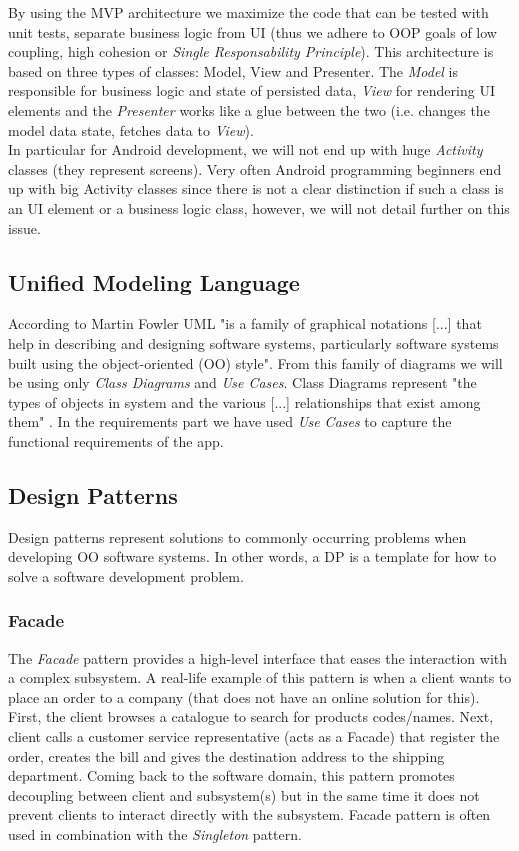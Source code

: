 \documentclass{article}[11]
\begin{document}
	 By using the \ac{MVP} architecture we maximize the code that can be tested with unit tests, separate business logic from UI (thus we adhere to OOP goals of low coupling, high cohesion or \emph{Single Responsability Principle}).  This architecture is based on three types of classes: Model, View and Presenter. The \emph{Model} is responsible for business logic and state of persisted data, \emph{View} for rendering UI elements and the \emph{Presenter} works like a glue between the two (i.e. changes the model data state, fetches data to \emph{View}).\\
	
	 In particular for Android development, we will not end up with huge \emph{Activity} classes (they represent screens). Very often Android programming beginners end up with big Activity classes since there is not a clear distinction if such a class is an UI element or a business logic class, however, we will not detail further on this issue.
	
	\subsection{Unified Modeling Language}
	According to Martin Fowler \cite{fowler2004uml} \ac{UML} "is a family of graphical notations [...] that help in describing and designing software systems, particularly software systems built using the object-oriented (OO) style". From this family of diagrams we will be using only \emph{Class Diagrams}  and \emph{Use Cases}. Class Diagrams represent "the types of objects in system and the various [...] relationships that exist among them" . In the requirements  part we have used \emph{Use Cases} to capture the functional requirements of the app.
	\subsection{Design Patterns}
	Design patterns represent solutions to commonly occurring  problems when developing OO software systems. In other words, a DP is a template for how to solve a software development problem.
	\subsubsection{Facade}
	The \emph{Facade} pattern provides a high-level interface that eases the interaction with a complex subsystem. A real-life example of this pattern is when a client wants to place an order to a company (that does not have an online solution for this).  First, the client browses a catalogue to search for products codes/names. Next, client   calls a customer service representative (acts as a Facade) that register the order, creates the bill and gives the destination address to the shipping department. Coming back to the software domain, this pattern promotes decoupling between client and subsystem(s) but in the same time it does not prevent clients to interact directly with the subsystem. Facade pattern is often used in combination with the \emph{Singleton} pattern.
	
\end{document}
